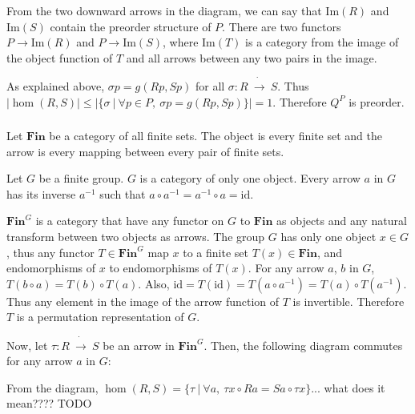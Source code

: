 \documentclass{article}
\begin{document}
\begin{center}
\end{center}

From the two downward arrows in the diagram, we can say that $\mathrm{Im}(R)$ and $\mathrm{Im}(S)$ contain the preorder structure of $P$. There are two functors $P \rightarrow \mathrm{Im}(R)$ and $P \rightarrow \mathrm{Im}(S)$, where $\mathrm{Im}(T)$ is a category from the image of the object function of $T$ and all arrows between any two pairs in the image.

As explained above, $\sigma p = g(Rp, Sp)$ for all $\sigma : R\ \dot{\rightarrow}\ S$. Thus $|\hom(R, S)| \leq |\{\sigma\ |\ \forall p \in P,\ \sigma p = g(Rp, Sp)\}| = 1$. Therefore $Q^P$ is preorder.

\subsubsection{}



\showArt

Let $\mathbf{Fin}$ be a category of all finite sets. The object is every finite set and the arrow is every mapping between every pair of finite sets.

Let $G$ be a finite group. $G$ is a category of only one object. Every arrow $a$ in $G$ has its inverse $a^{-1}$ such that $a \circ a^{-1} = a^{-1} \circ a = \mathrm{id}$.

$\mathbf{Fin}^G$ is a category that have any functor on $G$ to $\mathbf{Fin}$ as objects and any natural transform between two objects as arrows. The group $G$ has only one object $x \in G$, thus any functor $T \in \mathbf{Fin}^G$ map $x$ to a finite set $T(x) \in \mathbf{Fin}$, and endomorphisms of $x$ to endomorphisms of $T(x)$. For any arrow $a$, $b$ in $G$, $T(b \circ a) = T(b) \circ T(a)$. Also, $\mathrm{id} = T(\mathrm{id}) = T(a \circ a^{-1}) = T(a) \circ T(a^{-1})$. Thus any element in the image of the arrow function of $T$ is invertible. Therefore $T$ is a permutation representation of $G$.

Now, let $\tau : R\ \dot{\rightarrow}\ S$ be an arrow in $\mathbf{Fin}^G$. Then, the following diagram commutes for any arrow $a$ in $G$:
\begin{center}
\end{center}
From the diagram, $\hom(R, S) = \{\tau\ |\ \forall a,\ \tau x \circ R a = S a \circ \tau x\}$... what does it mean???? TODO
\end{document}
